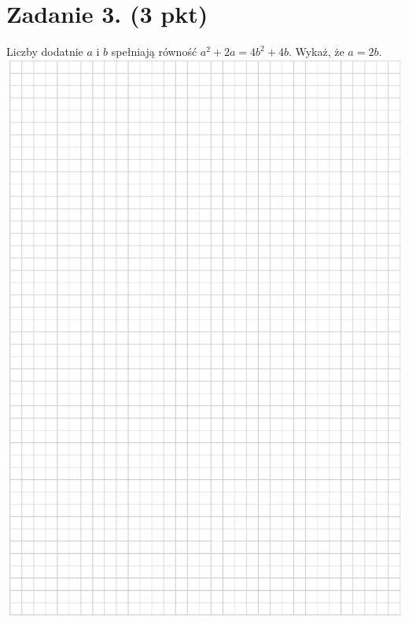 \documentclass[10pt]{article}
\begin{document}
\section*{Zadanie 3. (3 pkt)}
Liczby dodatnie \(a\) i \(b\) spełniają równość \(a^{2}+2 a=4 b^{2}+4 b\). Wykaż, że \(a=2 b\).\\
\includegraphics[max width=\textwidth, center]{2024_11_21_ebf83f11df6f4915f701g-04}
\end{document}
